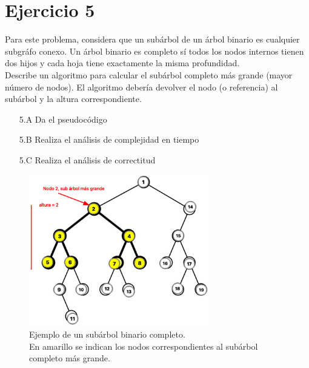 \documentclass[12pt]{article}
\begin{document}
\section*{Ejercicio 5}
Para este problema, considera que un subárbol de un árbol binario es cualquier subgráfo conexo. Un árbol binario es completo sí todos los nodos internos tienen dos hijos y cada hoja tiene exactamente la misma profundidad.\\
Describe un algoritmo para calcular el subárbol completo más grande (mayor número de nodos). El algoritmo debería devolver el nodo (o referencia) al subárbol y la altura correspondiente.
\begin{itemize}
    \item[5.A] Da el pseudocódigo
    \item[5.B] Realiza el análisis de complejidad en tiempo
    \item[5.C] Realiza el análisis de correctitud
\end{itemize}
\begin{figure}[H]
    \centering
    \includegraphics[width=0.7\textwidth]{subárbol.png}
    \caption{Ejemplo de un subárbol binario completo.\\
    En amarillo se indican los nodos correspondientes al subárbol completo más grande.}
\end{figure}
\end{document}
